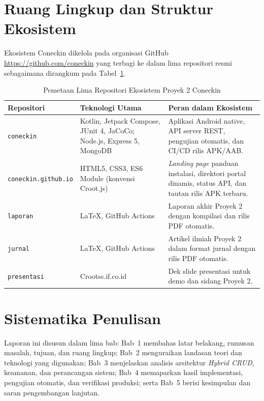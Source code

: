 \section{Ruang Lingkup dan Struktur Ekosistem}
Ekosistem Coneckin dikelola pada organisasi GitHub \url{https://github.com/coneckin} yang terbagi ke dalam lima repositori resmi sebagaimana dirangkum pada Tabel~\ref{tab:ekosistem}.

\begin{table}[H]
\centering
\caption{Pemetaan Lima Repositori Ekosistem Proyek 2 Coneckin}
\label{tab:ekosistem}
\begin{tabular}{@{}p{3.1cm}p{4.1cm}p{5.6cm}@{}}
\toprule
\textbf{Repositori} & \textbf{Teknologi Utama} & \textbf{Peran dalam Ekosistem} \\
\midrule
\texttt{coneckin} & Kotlin, Jetpack Compose, JUnit 4, JaCoCo; Node.js, Express 5, MongoDB & Aplikasi Android native, API server REST, pengujian otomatis, dan CI/CD rilis APK/AAB. \\
\texttt{coneckin.github.io} & HTML5, CSS3, ES6 Module (konvensi Croot.js) & \textit{Landing page} panduan instalasi, direktori portal dinamis, status API, dan tautan rilis APK terbaru. \\
\texttt{laporan} & LaTeX, GitHub Actions & Laporan akhir Proyek 2 dengan kompilasi dan rilis PDF otomatis. \\
\texttt{jurnal} & LaTeX, GitHub Actions & Artikel ilmiah Proyek 2 dalam format jurnal dengan rilis PDF otomatis. \\
\texttt{presentasi} & Crootss.if.co.id & Dek slide presentasi untuk demo dan sidang Proyek 2. \\
\bottomrule
\end{tabular}
\end{table}

\section{Sistematika Penulisan}
Laporan ini disusun dalam lima bab: Bab~1 membahas latar belakang, rumusan masalah, tujuan, dan ruang lingkup; Bab~2 menguraikan landasan teori dan teknologi yang digunakan; Bab~3 menjelaskan analisis arsitektur \textit{Hybrid CRUD}, keamanan, dan perancangan sistem; Bab~4 memaparkan hasil implementasi, pengujian otomatis, dan verifikasi produksi; serta Bab~5 berisi kesimpulan dan saran pengembangan lanjutan.
